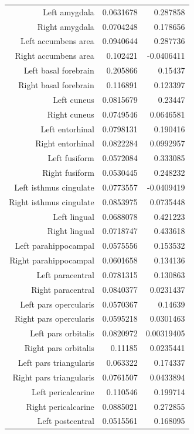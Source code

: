 \documentclass{article}
\begin{document}
\begin{table}[h]
\begin{centering}
\begin{tabular}{|r|r|r|}
      Left amygdala & 0.0631678 & 0.287858 \\
      Right amygdala & 0.0704248 & 0.178656 \\
      Left accumbens area & 0.0940644 & 0.287736 \\
      Right accumbens area & 0.102421 & -0.0406411 \\
      Left basal forebrain & 0.205866 & 0.15437 \\
      Right basal forebrain & 0.116891 & 0.123397 \\
      Left cuneus & 0.0815679 & 0.23447 \\
      Right cuneus & 0.0749546 & 0.0646581 \\
      Left entorhinal & 0.0798131 & 0.190416 \\
      Right entorhinal & 0.0822284 & 0.0992957 \\
      Left fusiform & 0.0572084 & 0.333085 \\
      Right fusiform & 0.0530445 & 0.248232 \\
      Left isthmus cingulate & 0.0773557 & -0.0409419 \\
      Right isthmus cingulate & 0.0853975 & 0.0735448 \\
      Left lingual & 0.0688078 & 0.421223 \\
      Right lingual & 0.0718747 & 0.433618 \\
      Left parahippocampal & 0.0575556 & 0.153532 \\
      Right parahippocampal & 0.0601658 & 0.134136 \\
      Left paracentral & 0.0781315 & 0.130863 \\
      Right paracentral & 0.0840377 & 0.0231437 \\
      Left pars opercularis & 0.0570367 & 0.14639 \\
      Right pars opercularis & 0.0595218 & 0.0301463 \\
      Left pars orbitalis & 0.0820972 & 0.00319405 \\
      Right pars orbitalis & 0.11185 & 0.0235441 \\
      Left pars triangularis & 0.063322 & 0.174337 \\
      Right pars triangularis & 0.0761507 & 0.0433894 \\
      Left pericalcarine & 0.110546 & 0.199714 \\
      Right pericalcarine & 0.0885021 & 0.272855 \\
      Left postcentral & 0.0515561 & 0.168095 \\

\end{tabular}
\end{centering}
\end{table}
\end{document}
